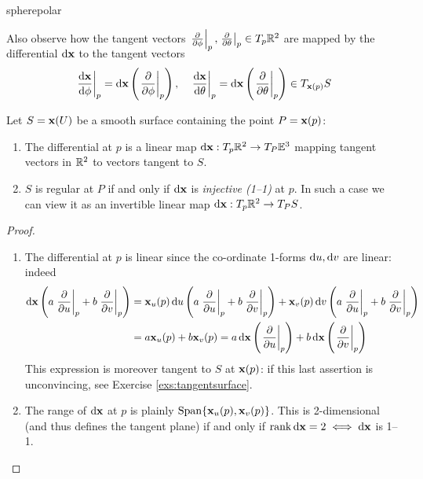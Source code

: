 \begin{example}{}{spherepolar}
\begin{minipage}{0.44\linewidth}
	\end{minipage}\medbreak
	Also observe how the tangent vectors $\smash[b]{\partialsat\phi p,\partialsat\theta p}\in T_p\R^2$ are mapped by the differential $\dvx$ to the tangent vectors
	\[\diffat[\vx]{\phi}p=\dvx\left(\partialsat\phi p\right),\quad \diffat[\vx]{\theta}p=\dvx\left(\partialsat\theta p\right)\in T_{\vx(p)}S\]
\end{example}

\goodbreak

\begin{thm}{}{}
Let $S=\vx(U)$ be a smooth surface containing the point $P=\vx(p)$:
\begin{enumerate}
  \item The differential at $p$ is a linear map $\dvx:T_p\R^2\to T_P\E^3$ mapping tangent vectors in $\R^2$ to vectors tangent to $S$.
  \item $S$ is regular at $P$ if and only if $\dvx$ is \emph{injective (1--1)} at $p$. In such a case we can view it as an invertible linear map $\dvx:T_p\R^2\to T_PS$.
\end{enumerate}
\end{thm}

\begin{proof}
\begin{enumerate}
  \item The differential at $p$ is linear since the co-ordinate 1-forms $\du,\dv$ are linear: indeed
  \begin{align*}
  \dvx\left(a\partialsat up+b\partialsat vp\right)&=\vx_u(p)\,\du\left(a\partialsat up+b\partialsat vp\right)+\vx_v(p)\,\dv\left(a\partialsat up+b\partialsat vp\right)\\
  &=a\vx_u(p)+b\vx_v(p) =a\,\dvx\left(\partialsat up\right)+b\,\dvx\left(\partialsat vp\right)
  \end{align*}
  This expression is moreover tangent to $S$ at $\vx(p)$: if this last assertion is unconvincing, see Exercise \ref{exs:tangentsurface}.
	\item The range of $\dvx$ at $p$ is plainly $\Span\{\vx_u(p),\vx_v(p)\}$. This is 2-dimensional (and thus defines the tangent plane) if and only if $\Rank \dvx=2\iff \dvx$ is 1--1.\qedhere
\end{enumerate}
\end{proof}

